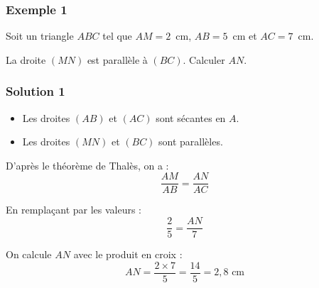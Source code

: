 \documentclass[12pt,a4paper]{article}
\begin{document}
\vspace{0.3cm}
\subsubsection*{\color{myred} Exemple 1}
Soit un triangle $ABC$ tel que $AM = 2$~cm, $AB = 5$~cm et $AC = 7$~cm. 

La droite $(MN)$ est parallèle à $(BC)$. Calculer $AN$.

\begin{center}
\end{center}
\subsubsection*{\color{myred} Solution 1}
\begin{itemize}
    \item Les droites $(AB)$ et $(AC)$ sont sécantes en $A$.
    \item Les droites $(MN)$ et $(BC)$ sont parallèles.
\end{itemize}
D'après le théorème de Thalès, on a :
$$\frac{AM}{AB} = \frac{AN}{AC}$$

En remplaçant par les valeurs :
$$\frac{2}{5} = \frac{AN}{7}$$

On calcule $AN$ avec le produit en croix :
$$AN = \frac{2 \times 7}{5} = \frac{14}{5} = 2{,}8\text{ cm}$$
\end{document}
